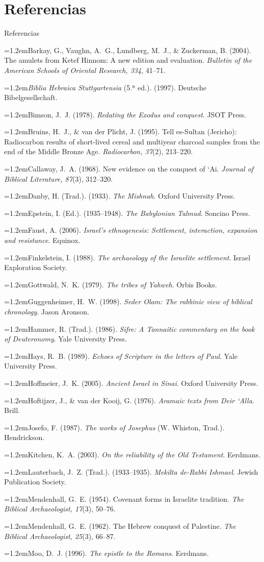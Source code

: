 \documentclass[hyperref={bookmarks=false},aspectratio=169]{beamer}
\newcommand{\refapa}[1]{\par\hangindent=1.2em\hangafter=1\noindent #1\par\vspace{3pt}}
\begin{document}
\section{Referencias}
\begin{frame}[allowframebreaks]{Referencias}
\tiny
\refapa{Barkay, G., Vaughn, A.~G., Lundberg, M.~J., \& Zuckerman, B. (2004). The amulets from Ketef Hinnom: A new edition and evaluation. \emph{Bulletin of the American Schools of Oriental Research, 334}, 41--71.}
\refapa{\emph{Biblia Hebraica Stuttgartensia} (5.ª ed.). (1997). Deutsche Bibelgesellschaft.}
\refapa{Bimson, J.~J. (1978). \emph{Redating the Exodus and conquest}. JSOT Press.}
\refapa{Bruins, H.~J., \& van der Plicht, J. (1995). Tell es-Sultan (Jericho): Radiocarbon results of short-lived cereal and multiyear charcoal samples from the end of the Middle Bronze Age. \emph{Radiocarbon, 37}(2), 213--220.}
\refapa{Callaway, J.~A. (1968). New evidence on the conquest of `Ai. \emph{Journal of Biblical Literature, 87}(3), 312--320.}
\refapa{Danby, H. (Trad.). (1933). \emph{The Mishnah}. Oxford University Press.}
\refapa{Epstein, I. (Ed.). (1935--1948). \emph{The Babylonian Talmud}. Soncino Press.}
\refapa{Faust, A. (2006). \emph{Israel's ethnogenesis: Settlement, interaction, expansion and resistance}. Equinox.}
\refapa{Finkelstein, I. (1988). \emph{The archaeology of the Israelite settlement}. Israel Exploration Society.}
\refapa{Gottwald, N.~K. (1979). \emph{The tribes of Yahweh}. Orbis Books.}
\refapa{Guggenheimer, H.~W. (1998). \emph{Seder Olam: The rabbinic view of biblical chronology}. Jason Aronson.}
\refapa{Hammer, R. (Trad.). (1986). \emph{Sifre: A Tannaitic commentary on the book of Deuteronomy}. Yale University Press.}
\refapa{Hays, R.~B. (1989). \emph{Echoes of Scripture in the letters of Paul}. Yale University Press.}
\refapa{Hoffmeier, J.~K. (2005). \emph{Ancient Israel in Sinai}. Oxford University Press.}
\refapa{Hoftijzer, J., \& van der Kooij, G. (1976). \emph{Aramaic texts from Deir `Alla}. Brill.}
\refapa{Josefo, F. (1987). \emph{The works of Josephus} (W. Whiston, Trad.). Hendrickson.}
\refapa{Kitchen, K.~A. (2003). \emph{On the reliability of the Old Testament}. Eerdmans.}
\refapa{Lauterbach, J.~Z. (Trad.). (1933--1935). \emph{Mekilta de-Rabbi Ishmael}. Jewish Publication Society.}
\refapa{Mendenhall, G.~E. (1954). Covenant forms in Israelite tradition. \emph{The Biblical Archaeologist, 17}(3), 50--76.}
\refapa{Mendenhall, G.~E. (1962). The Hebrew conquest of Palestine. \emph{The Biblical Archaeologist, 25}(3), 66--87.}
\refapa{Moo, D.~J. (1996). \emph{The epistle to the Romans}. Eerdmans.}

\end{frame}
\end{document}
